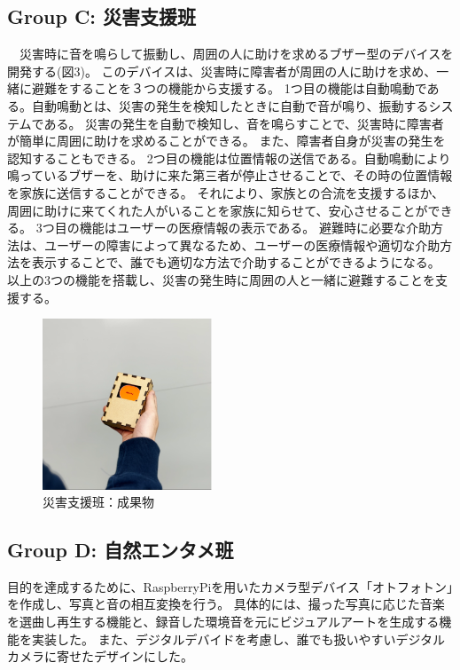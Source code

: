 \subsection{Group C: 災害支援班}
　災害時に音を鳴らして振動し、周囲の人に助けを求めるブザー型のデバイスを開発する(図3)。
このデバイスは、災害時に障害者が周囲の人に助けを求め、一緒に避難をすることを３つの機能から支援する。
1つ目の機能は自動鳴動である。自動鳴動とは、災害の発生を検知したときに自動で音が鳴り、振動するシステムである。
災害の発生を自動で検知し、音を鳴らすことで、災害時に障害者が簡単に周囲に助けを求めることができる。
また、障害者自身が災害の発生を認知することもできる。
2つ目の機能は位置情報の送信である。自動鳴動により鳴っているブザーを、助けに来た第三者が停止させることで、その時の位置情報を家族に送信することができる。
それにより、家族との合流を支援するほか、周囲に助けに来てくれた人がいることを家族に知らせて、安心させることができる。
3つ目の機能はユーザーの医療情報の表示である。
避難時に必要な介助方法は、ユーザーの障害によって異なるため、ユーザーの医療情報や適切な介助方法を表示することで、誰でも適切な方法で介助することができるようになる。
以上の3つの機能を搭載し、災害の発生時に周囲の人と一緒に避難することを支援する。
\begin{figure}[h]
  \centering
  \includegraphics[width=0.45\textwidth]{pages/report/images/saigaisien.png}
  \caption{災害支援班：成果物}
  \label{fig:ColorVisionApp}
\end{figure}
\subsection{Group D: 自然エンタメ班}
目的を達成するために、RaspberryPiを用いたカメラ型デバイス「オトフォトン」を作成し、写真と音の相互変換を行う。
具体的には、撮った写真に応じた音楽を選曲し再生する機能と、録音した環境音を元にビジュアルアートを生成する機能を実装した。
また、デジタルデバイドを考慮し、誰でも扱いやすいデジタルカメラに寄せたデザインにした。

